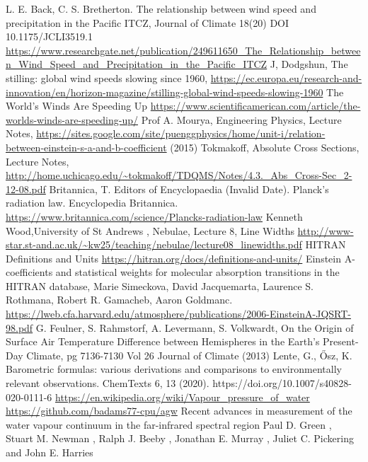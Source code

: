 \documentclass{book}
\begin{document}
\begin{thebibliography}{99}
	     L. E. Back, C. S. Bretherton. The relationship between wind speed and precipitation in the Pacific ITCZ, Journal of Climate 18(20) DOI 10.1175/JCLI3519.1
	     \url{https://www.researchgate.net/publication/249611650_The_Relationship_between_Wind_Speed_and_Precipitation_in_the_Pacific_ITCZ}
	     J, Dodgshun, The stilling: global wind speeds slowing since 1960, \url{https://ec.europa.eu/research-and-innovation/en/horizon-magazine/stilling-global-wind-speeds-slowing-1960}
	     The World’s Winds Are Speeding Up \url{https://www.scientificamerican.com/article/the-worlds-winds-are-speeding-up/}
		 Prof A. Mourya, Engineering Physics, Lecture Notes, \url{https://sites.google.com/site/puenggphysics/home/unit-i/relation-between-einstein-s-a-and-b-coefficient} (2015)
		 Tokmakoff, Absolute Cross Sections, Lecture Notes, \url{http://home.uchicago.edu/~tokmakoff/TDQMS/Notes/4.3._Abs_Cross-Sec_2-12-08.pdf}
		 Britannica, T. Editors of Encyclopaedia (Invalid Date). Planck's radiation law. Encyclopedia Britannica. \url{https://www.britannica.com/science/Plancks-radiation-law}
		 Kenneth Wood,University of St Andrews , Nebulae, Lecture 8, Line Widths \url{http://www-star.st-and.ac.uk/~kw25/teaching/nebulae/lecture08_linewidths.pdf}
		 HITRAN Definitions and Units \url{https://hitran.org/docs/definitions-and-units/}
		 Einstein A-coefficients and statistical weights for molecular
		absorption transitions in the HITRAN database, Marie Simeckova, David Jacquemarta, Laurence S. Rothmana,
		Robert R. Gamacheb, Aaron Goldmanc. \url{https://lweb.cfa.harvard.edu/atmosphere/publications/2006-EinsteinA-JQSRT-98.pdf}
		 G. Feulner, S. Rahmstorf, A. Levermann, S. Volkwardt, On the Origin of Surface Air Temperature Difference between Hemispheres in the Earth's Present-Day Climate,
		pg 7136-7130 Vol 26 Journal of Climate (2013)
		 Lente, G., Ősz, K. Barometric formulas: various derivations and comparisons to environmentally relevant observations. ChemTexts 6, 13 (2020). https://doi.org/10.1007/s40828-020-0111-6
		 \url{https://en.wikipedia.org/wiki/Vapour_pressure_of_water}
		 \url{https://github.com/badams77-cpu/agw}
		 Recent advances in measurement of the water vapour continuum in the far-infrared spectral region
		Paul D. Green
		, Stuart M. Newman
		, Ralph J. Beeby
		, Jonathan E. Murray
		, Juliet C. Pickering
		and John E. Harries

\end{thebibliography}
\end{document}
